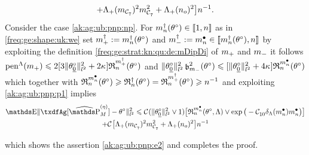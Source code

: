 \begin{pro}
\begin{multline}
  +\miSv[\Di_{\cst{7}}]^2\Di_{\cst{7}}^2+\miSv[\ssY_{o}]^2 \big]\ssY^{-1}.
\end{multline}
Consider the case \ref{ak:ag:ub:pnp:np}. For $\aDi{\ssY}(\xdf)\in\nset{1,n}$
as in \ref{freq:ge:shape:uk:we}  set $\pdDi:=\aDi{\ssY}(\xdf)$ and $\mdDi:=\sDi{\ssY}\in\nset{\aDi{\ssY}(\xdf),\ssY}$ by exploiting the definition
\eqref{freq:ge:strat:kn:qu:de:mDipDi} of $\pDi$ and $\mDi$ it follows
$\penSv[\pDi] \leq 2[3\Vnormlp{\xdf_{\underline{0}}}^2+ 2\cpen]
\daRa{\pdDi}{(\xdf)}$ and 
$\Vnormlp{\xdf_{\underline{0}}}^2\bias[\mDi]^2(\xdf)\leq
      [\Vnormlp{\xdf_{\underline{0}}}^2+4\cpen]\daRa{\sDi{\ssY}}{(\xdf)}$
which together with
$\daRa{\sDi{\ssY}}{(\xdf)}\geq\naRa{(\xdf)}=\daRa{\pdDi}{(\xdf)}\geq\ssY^{-1}$
and exploiting 
\eqref{ak:ag:ub:pnp:p1} implies%
 \begin{multline}\label{ak:ag:ub:pnp:p8}
   \E\Vnormlp{\txdfAg[{\erWe[]}]-\xdf}^2%
    \leq 
   \cst{}(\Vnormlp{\xdf_{\underline{0}}}^2\vee1)\big[\daRa{\sDi{\ssY}}{(\xdf,\Lambda)}\vee\exp\big(-\cst{10}\cmiSv[\sDi{\ssY}]\sDi{\ssY}\big)\big]\\
   +\cst{}\big[\miSv[\Di_{\cst{7}}]^2\Di_{\cst{7}}^2+\miSv[\ssY_{o}]^2 \big]\ssY^{-1}
\end{multline}

which shows the assertion \eqref{ak:ag:ub:pnp:e2} and completes the
proof.\proEnd\end{pro}

